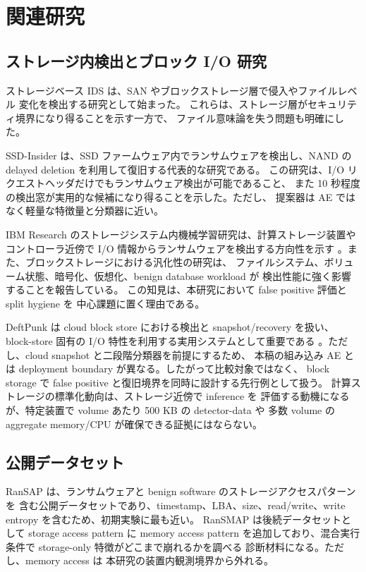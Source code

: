 \section{関連研究}

\subsection{ストレージ内検出とブロック I/O 研究}

ストレージベース IDS は、SAN やブロックストレージ層で侵入やファイルレベル
変化を検出する研究として始まった\cite{banikazemi2005san,allalouf2010idstor}。
これらは、ストレージ層がセキュリティ境界になり得ることを示す一方で、
ファイル意味論を失う問題も明確にした。

SSD-Insider は、SSD ファームウェア内でランサムウェアを検出し、NAND の
delayed deletion を利用して復旧する代表的な研究である\cite{baek2018ssdinsider}。
この研究は、I/O リクエストヘッダだけでもランサムウェア検出が可能であること、
また 10 秒程度の検出窓が実用的な候補になり得ることを示した。ただし、
提案器は AE ではなく軽量な特徴量と分類器に近い。

IBM Research のストレージシステム内機械学習研究は、計算ストレージ装置や
コントローラ近傍で I/O 情報からランサムウェアを検出する方向性を示す
\cite{ibmstorage2023}。また、ブロックストレージにおける汎化性の研究は、
ファイルシステム、ボリューム状態、暗号化、仮想化、benign database workload が
検出性能に強く影響することを報告している\cite{reategui2024generalizability}。
この知見は、本研究において false positive 評価と split hygiene を
中心課題に置く理由である。

DeftPunk は cloud block store における検出と snapshot/recovery を扱い、
block-store 固有の I/O 特性を利用する実用システムとして重要である
\cite{deftpunk2024}。ただし、cloud snapshot と二段階分類器を前提にするため、
本稿の組み込み AE とは deployment boundary が異なる。したがって比較対象ではなく、
block storage で false positive と復旧境界を同時に設計する先行例として扱う。
計算ストレージの標準化動向\cite{snia-csd}は、ストレージ近傍で inference を
評価する動機になるが、特定装置で volume あたり 500 KB の detector-data や
多数 volume の aggregate memory/CPU が確保できる証拠にはならない。

\subsection{公開データセット}

RanSAP は、ランサムウェアと benign software のストレージアクセスパターンを
含む公開データセットであり、timestamp、LBA、size、read/write、write entropy
を含むため、初期実験に最も近い\cite{ransap,hirano2021ransap}。
RanSMAP は後続データセットとして storage access pattern に memory access pattern
を追加しており、混合実行条件で storage-only 特徴がどこまで崩れるかを調べる
診断材料になる\cite{ransmap,hirano2024ransmap}。ただし、memory access は
本研究の装置内観測境界から外れる。

